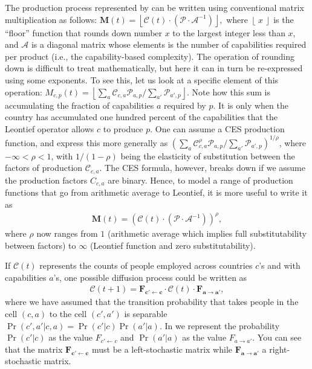 \documentclass[12pt]{article}
\newcommand{\mtx}[1]{\mathbf{ #1}}
\begin{document}
The production process represented by  can be written using conventional matrix multiplication as follows:
$
	\mtx{M}(t) = \left\lfloor \mtx{{\mathcal C}}(t)\cdot (\mtx{{\mathcal P}}\cdot \mtx{{\mathcal A}}^{-1})\right\rfloor,
$
where $\left\lfloor ~x~\right\rfloor$ is the ``floor'' function that rounds down number $x$ to the largest integer less than $x$, and $\mtx{{\mathcal A}}$ is a diagonal matrix whose elements is the number of capabilities required per product (i.e., the capability-based complexity). The operation of rounding down is difficult to treat mathematically, but here it can in turn be re-expressed using some exponents. To see this, let us look at a specific element of this operation: $M_{c,p}(t) = \left\lfloor \sum_a {\mathcal C}_{c,a}{\mathcal P}_{a,p}/\sum_{a'} {\mathcal P}_{a',p}\right\rfloor$. Note how this sum is accumulating the fraction of capabilities $a$ required by $p$. It is only when the country has accumulated one hundred percent of the capabilities that the Leontief operator allows $c$ to produce $p$. One can assume a CES production function, and express this more generally as $\left(\sum_a {\mathcal C}_{c,a}^{\rho}{\mathcal P}_{a,p}/\sum_{a'} {\mathcal P}_{a',p}\right)^{1/\rho}$, where $-\infty < \rho < 1$, with $1/(1-\rho)$ being the elasticity of substitution between the factors of production ${\mathcal C}_{c,a}$. The CES formula, however, breaks down if we assume the production factors $C_{c,a}$ are binary. Hence, to model a range of production functions that go from arithmetic average to Leontief, it is more useful to write it as 
\begin{align}
	\mtx{M}(t) = \left( \mtx{{\mathcal C}}(t)\cdot (\mtx{{\mathcal P}}\cdot \mtx{{\mathcal A}}^{-1})\right)^\rho,
\label{eq_rhoexponentfunction}
\end{align}	
where $\rho$ now ranges from $1$ (arithmetic average which implies full substitutability between factors) to $\infty$ (Leontief function and zero substitutability).


If $\mtx{{\mathcal C}}(t)$ represents the counts of people employed across countries $c$'s and with capabilities $a$'s, one possible diffusion process could be written as
\begin{align}
	\mtx{{\mathcal C}}(t+1) = \mtx{F_{c'\leftarrow c}}\cdot \mtx{{\mathcal C}}(t) \cdot \mtx{F_{a\rightarrow a'}},
\label{eq_diffusionofcapabilities}
\end{align}
where we have assumed that the transition probability that takes people in the cell $(c,a)$ to the cell $(c', a')$ is separable $\Pr(c',a'|c,a)=\Pr(c'|c)\Pr(a'|a)$. In  we represent the probability $\Pr(c'|c)$ as the value $F_{c'\leftarrow c}$ and $\Pr(a'|a)$ as the value $F_{a\rightarrow a'}$. You can see that the matrix $\mtx{F_{c'\leftarrow c}}$ must be a left-stochastic matrix while $\mtx{F_{a\rightarrow a'}}$ a right-stochastic matrix.
\end{document}
